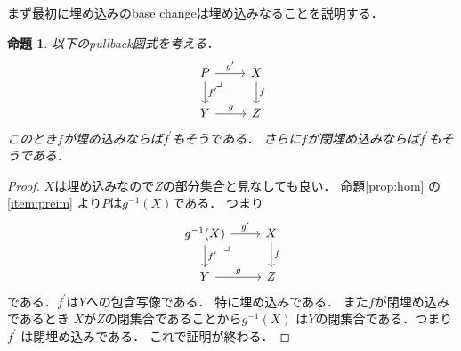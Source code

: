 \documentclass[leqno, a4paper, 12pt, dvipdfmx]{jsarticle}
\newtheorem{prop}[thm]{命題}
\begin{document}
まず最初に埋め込みのbase changeは埋め込みなることを説明する．
\begin{prop}\label{prop:cloimm}
以下のpullback図式を考える．
\[
\begin{tikzcd}
P \arrow[r, "g^{\prime}"] \arrow[d, "f^{\prime}"] \arrow[dr, phantom, "\lrcorner", very near start]
& X \arrow[d,"f"] \\
Y \arrow[r,"g"] & Z
\end{tikzcd}
\]
このとき$f$が埋め込みならば$f^{\prime}$もそうである．
さらに$f$が閉埋め込みならば$f^{\prime}$もそうである．
\end{prop}
\begin{proof}
$X$は埋め込みなので$Z$の部分集合と見なしても良い．
命題\ref{prop:hom}
の\ref{item:preim}
より$P$は$g^{-1}(X)$である．
つまり
\[
\begin{tikzcd}
g^{-1}(X) \arrow[r, "g^{\prime}"] \arrow[d, "f^{\prime}"] \arrow[dr, phantom, "\lrcorner", very near start]
& X \arrow[d,"f"] \\
Y \arrow[r,"g"] & Z
\end{tikzcd}
\]
である．$f^{\prime}$は$Y$への包含写像である．
特に埋め込みである．
また$f$が閉埋め込みであるとき
$X$が$Z$の閉集合であることから$g^{-1}(X)$
は$Y$の閉集合である．つまり$f^{\prime}$
は閉埋め込みである．
これで証明が終わる．
\end{proof}
\end{document}

